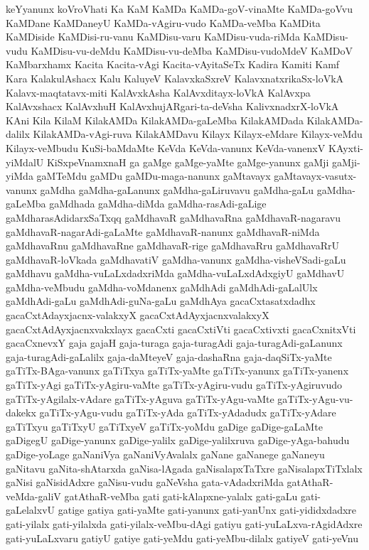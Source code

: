 {keYyanunx
koVroVhati
Ka
KaM
KaMDa
KaMDa-goV-vinaMte
KaMDa-goVvu
KaMDane
KaMDaneyU
KaMDa-vAgiru-vudo
KaMDa-veMba
KaMDita
KaMDiside
KaMDisi-ru-vanu
KaMDisu-varu
KaMDisu-vuda-riMda
KaMDisu-vudu
KaMDisu-vu-deMdu
KaMDisu-vu-deMba
KaMDisu-vudoMdeV
KaMDoV
KaMbarxhamx
Kacita
Kacita-vAgi
Kacita-vAyitaSeTx
Kadira
Kamiti
Kamf
Kara
KalakulAshacx
Kalu
KaluyeV
KalavxkaSxreV
KalavxnatxrikaSx-loVkA
Kalavx-maqtatavx-miti
KalAvxkAsha
KalAvxditayx-loVkA
KalAvxpa
KalAvxshacx
KalAvxhuH
KalAvxhujARgari-ta-deVsha
KalivxnadxrX-loVkA
KAni
Kila
KilaM
KilakAMDa
KilakAMDa-gaLeMba
KilakAMDada
KilakAMDa-dalilx
KilakAMDa-vAgi-ruva
KilakAMDavu
Kilayx
Kilayx-eMdare
Kilayx-veMdu
Kilayx-veMbudu
KuSi-baMdaMte
KeVda
KeVda-vanunx
KeVda-vanenxV
KAyxti-yiMdalU
KiSxpeVnamxnaH
ga
gaMge
gaMge-yaMte
gaMge-yanunx
gaMji
gaMji-yiMda
gaMTeMdu
gaMDu
gaMDu-maga-nanunx
gaMtavayx
gaMtavayx-vasutx-vanunx
gaMdha
gaMdha-gaLanunx
gaMdha-gaLiruvavu
gaMdha-gaLu
gaMdha-gaLeMba
gaMdhada
gaMdha-diMda
gaMdha-rasAdi-gaLige
gaMdharasAdidarxSaTxqq
gaMdhavaR
gaMdhavaRna
gaMdhavaR-nagaravu
gaMdhavaR-nagarAdi-gaLaMte
gaMdhavaR-nanunx
gaMdhavaR-niMda
gaMdhavaRnu
gaMdhavaRne
gaMdhavaR-rige
gaMdhavaRru
gaMdhavaRrU
gaMdhavaR-loVkada
gaMdhavatiV
gaMdha-vanunx
gaMdha-visheVSadi-gaLu
gaMdhavu
gaMdha-vuLaLxdadxriMda
gaMdha-vuLaLxdAdxgiyU
gaMdhavU
gaMdha-veMbudu
gaMdha-voMdanenx
gaMdhAdi
gaMdhAdi-gaLalUlx
gaMdhAdi-gaLu
gaMdhAdi-guNa-gaLu
gaMdhAya
gacaCxtasatxdadhx
gacaCxtAdayxjacnx-valakxyX
gacaCxtAdAyxjacnxvalakxyX
gacaCxtAdAyxjacnxvakxlayx
gacaCxti
gacaCxtiVti
gacaCxtivxti
gacaCxnitxVti
gacaCxnevxY
gaja
gajaH
gaja-turaga
gaja-turagAdi
gaja-turagAdi-gaLanunx
gaja-turagAdi-gaLalilx
gaja-daMteyeV
gaja-dashaRna
gaja-daqSiTx-yaMte
gaTiTx-BAga-vanunx
gaTiTxya
gaTiTx-yaMte
gaTiTx-yanunx
gaTiTx-yanenx
gaTiTx-yAgi
gaTiTx-yAgiru-vaMte
gaTiTx-yAgiru-vudu
gaTiTx-yAgiruvudo
gaTiTx-yAgilalx-vAdare
gaTiTx-yAguva
gaTiTx-yAgu-vaMte
gaTiTx-yAgu-vu-dakekx
gaTiTx-yAgu-vudu
gaTiTx-yAda
gaTiTx-yAdadudx
gaTiTx-yAdare
gaTiTxyu
gaTiTxyU
gaTiTxyeV
gaTiTx-yoMdu
gaDige
gaDige-gaLaMte
gaDigegU
gaDige-yanunx
gaDige-yalilx
gaDige-yalilxruva
gaDige-yAga-bahudu
gaDige-yoLage
gaNaniVya
gaNaniVyAvalalx
gaNane
gaNanege
gaNaneyu
gaNitavu
gaNita-shAtarxda
gaNisa-lAgada
gaNisalapxTaTxre
gaNisalapxTiTxlalx
gaNisi
gaNisidAdxre
gaNisu-vudu
gaNeVsha
gata-vAdadxriMda
gatAthaR-veMda-galiV
gatAthaR-veMba
gati
gati-kAlapxne-yalalx
gati-gaLu
gati-gaLelalxvU
gatige
gatiya
gati-yaMte
gati-yanunx
gati-yanUnx
gati-yididxdadxre
gati-yilalx
gati-yilalxda
gati-yilalx-veMbu-dAgi
gatiyu
gati-yuLaLxva-rAgidAdxre
gati-yuLaLxvaru
gatiyU
gatiye
gati-yeMdu
gati-yeMbu-dilalx
gatiyeV
gati-yeVnu
}
